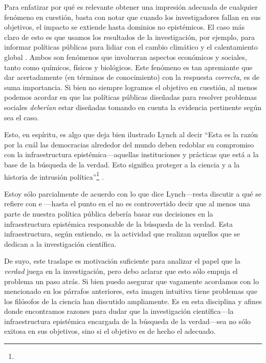 Para enfatizar por qué es relevante obtener una impresión adecuada de cualquier fenómeno en
cuestión, basta con notar que cuando los investigadores fallan en sus objetivos, el
impacto se extiende hasta dominios no epistémicos. El caso más claro de esto es que
usamos los resultados de la investigación, por ejemplo, para informar políticas
públicas para lidiar con el cambio climático y el calentamiento global
\parencite{stern2007}. Ambos son fenómenos que involucran aspectos económicos y
sociales, tanto como químicos, físicos y biológicos. Este fenómeno es tan apremiante
que dar acertadamente (en términos de conocimiento) con la respuesta
\textit{correcta}, es de suma importancia. Si bien no siempre logramos el objetivo en
cuestión, al menos podemos acordar en que las políticas públicas diseñadas para
resolver problemas sociales \textit{deberían} estar diseñadas tomando en cuenta la
evidencia pertinente según sea el caso.

Esto, en espíritu, es algo que deja bien ilustrado Lynch al decir ``Esta es la razón
por la cuál las democracias alrededor del mundo deben redoblar su compromiso con la
infraestructura epistémica---aquellas instituciones y prácticas que está a la base de
la búsqueda de la verdad. Esto significa proteger a la ciencia y a la historia de
intrusión política''\footnote{ } \parencite{lynch2025truth}.

Estoy sólo parcialmente de acuerdo con lo que dice Lynch---resta discutir a qué se
refiere con  e ---hasta el punto en el no es
controvertido decir que al menos una parte de nuestra política pública debería basar
sus decisiones en la infraestructura epistémica responsable de la búsqueda de la
verdad. Esta infraestructura, según entiendo, es la actividad que realizan aquellos
que se dedican a la investigación científica.

De suyo, este traslape es motivación suficiente para analizar el papel que la
\textit{verdad} juega en la investigación, pero debo aclarar que esto sólo empuja el
problema un paso atrás. Si bien puedo asegurar que vagamente acordamos con lo
mencionado en los párrafos anteriores, esta imagen intuitiva tiene problemas que los
filósofos de la ciencia han discutido ampliamente. Es en esta disciplina y afines
donde encontramos razones para dudar que la investigación científica---la
infraestructura epistémica encargada de la búsqueda de la verdad---sea no sólo
exitosa en sus objetivos, sino si el objetivo es de hecho el adecuado.

